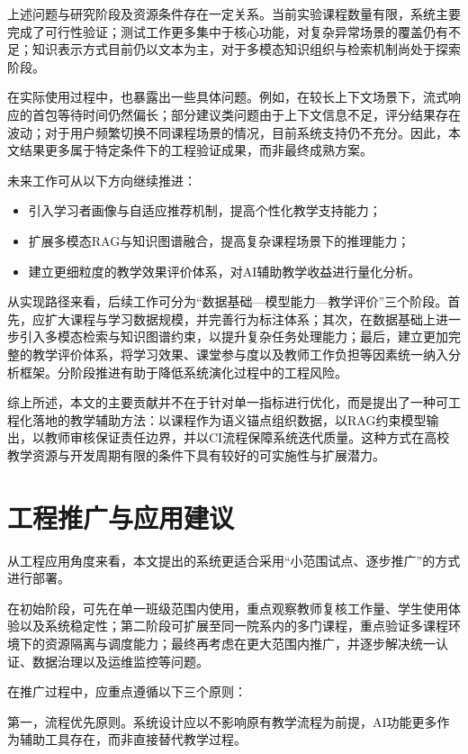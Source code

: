 \documentclass[12pt,a4paper,oneside]{ctexbook}
\numberwithin{equation}{chapter}
\begin{document}
上述问题与研究阶段及资源条件存在一定关系。当前实验课程数量有限，系统主要完成了可行性验证；测试工作更多集中于核心功能，对复杂异常场景的覆盖仍有不足；知识表示方式目前仍以文本为主，对于多模态知识组织与检索机制尚处于探索阶段。

在实际使用过程中，也暴露出一些具体问题。例如，在较长上下文场景下，流式响应的首包等待时间仍然偏长；部分建议类问题由于上下文信息不足，评分结果存在波动；对于用户频繁切换不同课程场景的情况，目前系统支持仍不充分。因此，本文结果更多属于特定条件下的工程验证成果，而非最终成熟方案。

未来工作可从以下方向继续推进：

\begin{itemize}
  \item 引入学习者画像与自适应推荐机制，提高个性化教学支持能力；
  \item 扩展多模态RAG与知识图谱融合，提高复杂课程场景下的推理能力；
  \item 建立更细粒度的教学效果评价体系，对AI辅助教学收益进行量化分析。
\end{itemize}

从实现路径来看，后续工作可分为“数据基础—模型能力—教学评价”三个阶段。首先，应扩大课程与学习数据规模，并完善行为标注体系；其次，在数据基础上进一步引入多模态检索与知识图谱约束，以提升复杂任务处理能力；最后，建立更加完整的教学评价体系，将学习效果、课堂参与度以及教师工作负担等因素统一纳入分析框架。分阶段推进有助于降低系统演化过程中的工程风险。

综上所述，本文的主要贡献并不在于针对单一指标进行优化，而是提出了一种可工程化落地的教学辅助方法：以课程作为语义锚点组织数据，以RAG约束模型输出，以教师审核保证责任边界，并以CI流程保障系统迭代质量。这种方式在高校教学资源与开发周期有限的条件下具有较好的可实施性与扩展潜力。

\section{工程推广与应用建议}

从工程应用角度来看，本文提出的系统更适合采用“小范围试点、逐步推广”的方式进行部署。

在初始阶段，可先在单一班级范围内使用，重点观察教师复核工作量、学生使用体验以及系统稳定性；第二阶段可扩展至同一院系内的多门课程，重点验证多课程环境下的资源隔离与调度能力；最终再考虑在更大范围内推广，并逐步解决统一认证、数据治理以及运维监控等问题。

在推广过程中，应重点遵循以下三个原则：

第一，流程优先原则。系统设计应以不影响原有教学流程为前提，AI功能更多作为辅助工具存在，而非直接替代教学过程。
\end{document}
